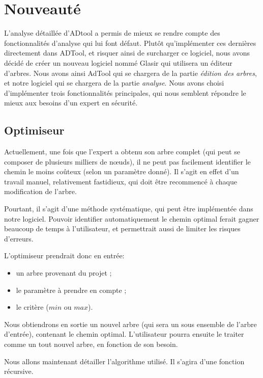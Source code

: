 \section{Nouveauté}
	
	L'analyse détaillée d'ADtool a permis de mieux se rendre compte des fonctionnalités d'analyse qui lui font défaut. Plutôt qu'implémenter ces dernières directement dans ADTool, et risquer ainsi de surcharger ce logiciel, nous avons décidé de créer un nouveau logiciel nommé Glasir qui utilisera un éditeur d'arbres. Nous avons ainsi AdTool qui se chargera de la partie \textit{édition des arbres}, et notre logiciel qui se chargera de la partie \textit{analyse}. Nous avons choisi d'implémenter trois fonctionnalités principales, qui nous semblent répondre le mieux aux besoins d'un expert en sécurité.

	\subsection{Optimiseur}

		Actuellement, une fois que l'expert a obtenu son arbre complet (qui peut se composer de plusieurs milliers de nœuds), il ne peut pas facilement identifier le chemin le moins coûteux (selon un paramètre donné).
		Il s'agit en effet d'un travail manuel, relativement fastidieux, qui doit être recommencé à chaque modification de l'arbre.
		
		Pourtant, il s'agit d'une méthode systématique, qui peut être implémentée dans notre logiciel. Pouvoir identifier automatiquement le chemin optimal ferait gagner beaucoup de temps à l'utilisateur, et permettrait aussi de limiter les risques d'erreurs.
		
		L'optimiseur prendrait donc en entrée:
		\begin{itemize}
			\item un arbre provenant du projet ;
			\item le paramètre à prendre en compte ;
			\item le critère ($min$ ou $max$).
		\end{itemize}
		
		Nous obtiendrons en sortie un nouvel arbre (qui sera un sous ensemble de l'arbre d'entrée), contenant le chemin optimal. 
		L'utilisateur pourra ensuite le traiter comme un tout nouvel arbre, en fonction de son besoin.
		
		Nous allons maintenant détailler l'algorithme utilisé. Il s'agira d'une fonction récursive.

